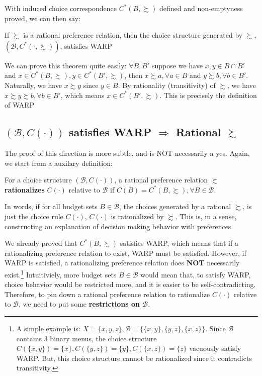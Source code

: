 With induced choice correspondence $C^*(B,\succsim)$ defined and non-emptyness proved, we can then say:
\begin{theorem}\label{thm_rational_leadto_WARP}
    If $\succsim$ is a rational preference relation, then the choice structure generated by $\succsim$, $(\mathcal{B},C^*(\cdot,\succsim))$, satisfies WARP
\end{theorem}

We can prove this theorem quite easily: $\forall B,B'$ suppose we have $x,y\in B\cap B'$ and $x\in C^*(B,\succsim),y\in C^*(B',\succsim)$, then $x\succsim a, \forall a\in B$ and $y\succsim b,\forall b\in B'$. Naturally, we have $x\succsim y$ since $y\in B$. By rationality (transitivity) of $\succsim$, we have $x\succsim y\succsim b,\forall b\in B'$, which means $x\in C^*(B',\succsim)$. This is precisely the definition of WARP

\subsection*{$(\mathcal{B},C(\cdot))$ satisfies WARP $\Rightarrow$ Rational $\succsim$}
The proof of this direction is more subtle, and is NOT necessarily a yes. Again, we start from a auxilary definition:
\begin{definition}\label{def_rationalize_choice}
    For a choice structure $(\mathcal{B},C(\cdot))$, a rational preference relation $\succsim$ \textbf{rationalizes} $C(\cdot)$ relative to $\mathcal{B}$ if $C(B)=C^*(B,\succsim), \forall B\in\mathcal{B}$.
\end{definition}

In words, if for all budget sets $B\in\mathcal{B}$, the choices generated by a rational $\succsim$, is just the choice rule $C(\cdot)$, $C(\cdot)$ is rationalized by $\succsim$. This is, in a sense, constructing an explanation of decision making behavior with preferences.

We already proved that $C^*(B,\succsim)$ satisfies WARP, which means that if a rationalizing preference relation to exist, WARP must be satisfied. However, if WARP is satisfied, a rationalizing preference relation does \textbf{NOT} necessarily exist.\footnote{A simple example is: $X=\{x,y,z\},\mathcal{B}=\{\{x,y\},\{y,z\},\{x,z\}\}$. Since $\mathcal{B}$ contains 3 binary menus, the choice structure $C(\{x,y\})=\{x\},C(\{y,z\})=\{y\},C(\{x,z\})=\{z\}$ vacuously satisfy WARP. But, this choice structure cannot be rationalized since it contradicts transitivity.}
Intuitiviely, more budget sets $B\in\mathcal{B}$ would mean that, to satisfy WARP, choice behavior would be restricted more, and it is easier to be self-contradicting. Therefore, to pin down a rational preference relation to rationalize $C(\cdot)$ relative to $\mathcal{B}$, we need to put some \textbf{restrictions on $\mathcal{B}$}.

